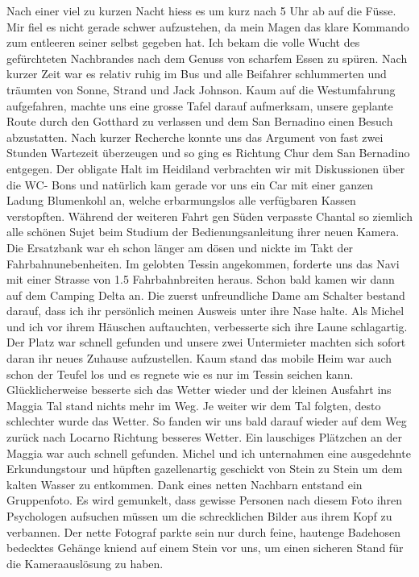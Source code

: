 Nach einer viel zu kurzen Nacht hiess es um kurz nach 5 Uhr ab auf die Füsse.
Mir fiel es nicht gerade schwer aufzustehen, da mein Magen das klare Kommando zum entleeren seiner selbst gegeben hat.
Ich bekam die volle Wucht des gefürchteten Nachbrandes nach dem Genuss von scharfem Essen zu spüren.
Nach kurzer Zeit war es relativ ruhig im Bus und alle Beifahrer schlummerten und träumten von Sonne, Strand und Jack Johnson.
Kaum auf die Westumfahrung aufgefahren, machte uns eine grosse Tafel darauf aufmerksam,
unsere geplante Route durch den Gotthard zu verlassen und dem San Bernadino einen Besuch abzustatten.
Nach kurzer Recherche konnte uns das Argument von fast zwei Stunden Wartezeit überzeugen und so ging es Richtung Chur dem San Bernadino entgegen.
Der obligate Halt im Heidiland verbrachten wir mit Diskussionen über die WC- Bons und natürlich kam gerade vor uns ein Car mit einer ganzen Ladung Blumenkohl an, welche erbarmungslos alle verfügbaren Kassen verstopften.
Während der weiteren Fahrt gen
Süden verpasste Chantal so ziemlich alle schönen Sujet beim Studium der Bedienungsanleitung ihrer neuen Kamera.
Die Ersatzbank war eh schon länger am dösen und nickte im Takt der Fahrbahnunebenheiten.
Im gelobten Tessin angekommen, forderte uns das Navi mit einer Strasse von 1.5 Fahrbahnbreiten heraus.
Schon bald kamen wir dann auf dem Camping Delta an.
Die zuerst unfreundliche Dame am Schalter bestand darauf, dass ich ihr persönlich meinen Ausweis unter ihre Nase halte.
Als Michel und ich vor ihrem Häuschen auftauchten, verbesserte sich ihre Laune schlagartig.
Der Platz war schnell gefunden und unsere zwei Untermieter machten sich sofort daran ihr neues Zuhause aufzustellen.
Kaum stand das mobile Heim war auch schon der Teufel los und es regnete wie es nur im Tessin seichen kann.
Glücklicherweise besserte sich das Wetter wieder und der kleinen Ausfahrt ins Maggia Tal stand nichts mehr im Weg.
Je weiter wir dem Tal folgten, desto schlechter wurde das Wetter.
So fanden wir uns bald
darauf wieder auf dem Weg zurück nach Locarno Richtung besseres Wetter.
Ein lauschiges Plätzchen an der Maggia war auch schnell gefunden.
Michel und ich unternahmen eine ausgedehnte Erkundungstour und hüpften gazellenartig geschickt von Stein zu Stein um dem kalten Wasser zu entkommen.
Dank eines netten Nachbarn entstand ein Gruppenfoto.
Es wird gemunkelt, dass gewisse Personen nach diesem Foto ihren Psychologen aufsuchen müssen um die schrecklichen Bilder aus ihrem Kopf zu verbannen.
Der nette Fotograf parkte sein nur durch feine, hautenge Badehosen bedecktes Gehänge kniend auf einem Stein vor uns, um einen sicheren \glqq Stand\grqq{} für die Kameraauslösung zu haben.
